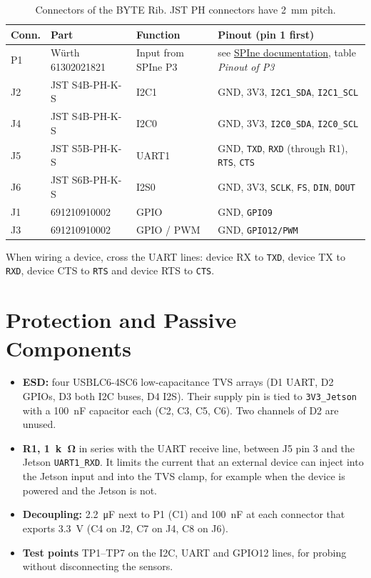 \documentclass[11pt,a4paper]{article}
\newcommand{\net}[1]{\texttt{#1}}
\newcommand{\spinedoc}{\href{run:../../BYTE_SPIne/Documentation/BYTE_SPIne_Documentation.pdf}{SPIne documentation}}
\begin{document}
\begin{table}[H]
\centering
\small
\setlength{\tabcolsep}{4pt}
\begin{tabular}{llll}
\toprule
Conn. & Part & Function & Pinout (pin 1 first) \\
\midrule
P1 & Würth 61302021821 & Input from SPIne P3 & see \spinedoc, table \emph{Pinout of P3} \\
J2 & JST S4B-PH-K-S & I2C1 & GND, 3V3, \net{I2C1\_SDA}, \net{I2C1\_SCL} \\
J4 & JST S4B-PH-K-S & I2C0 & GND, 3V3, \net{I2C0\_SDA}, \net{I2C0\_SCL} \\
J5 & JST S5B-PH-K-S & UART1 & GND, \net{TXD}, \net{RXD} (through R1), \net{RTS}, \net{CTS} \\
J6 & JST S6B-PH-K-S & I2S0 & GND, 3V3, \net{SCLK}, \net{FS}, \net{DIN}, \net{DOUT} \\
J1 & 691210910002 & GPIO & GND, \net{GPIO9} \\
J3 & 691210910002 & GPIO / PWM & GND, \net{GPIO12/PWM} \\
\bottomrule
\end{tabular}
\caption{Connectors of the BYTE Rib. JST PH connectors have \qty{2}{mm} pitch.}
\label{tab:conn}
\end{table}

When wiring a device, cross the UART lines: device RX to \net{TXD}, device TX to \net{RXD},
device CTS to \net{RTS} and device RTS to \net{CTS}.

\section{Protection and Passive Components}

\begin{itemize}
    \item \textbf{ESD:} four USBLC6-4SC6 low-capacitance TVS arrays (D1 UART, D2 GPIOs, D3 both I2C
    buses, D4 I2S). Their supply pin is tied to \net{3V3\_Jetson} with a \qty{100}{nF} capacitor each
    (C2, C3, C5, C6).
    Two channels of D2 are unused.
    \item \textbf{R1, \qty{1}{k\ohm}} in series with the UART receive line, between J5 pin 3 and the
    Jetson \net{UART1\_RXD}. It limits the current that an external device can inject into the Jetson
    input and into the TVS clamp, for example when the device is powered and the Jetson is not.
    \item \textbf{Decoupling:} \qty{2.2}{\micro F} next to P1 (C1) and \qty{100}{nF} at each connector
    that exports \qty{3.3}{V} (C4 on J2, C7 on J4, C8 on J6).
    \item \textbf{Test points} TP1--TP7 on the I2C, UART and GPIO12 lines, for probing without
    disconnecting the sensors.
\end{itemize}
\end{document}
